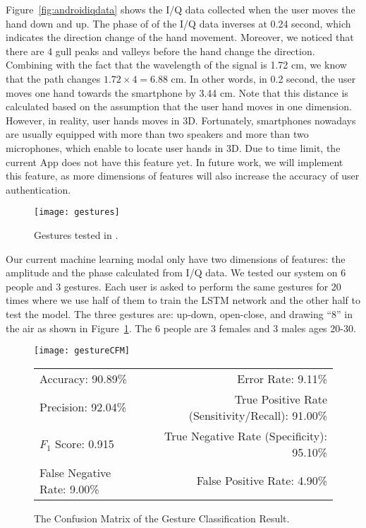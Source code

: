 Figure~\ref{fig:androidiqdata} shows the I/Q data collected when the user moves the hand down and up. The phase of of the I/Q data inverses at 0.24 second, which indicates the direction change of the hand movement. Moreover, we noticed that there are 4 gull peaks and valleys before the hand change the direction. Combining with the fact that the wavelength of the signal is 1.72 cm, we know that the path changes $1.72 \times 4 = 6.88$ cm. In other words, in 0.2 second, the user moves one hand towards the smartphone by 3.44 cm. Note that this distance is calculated based on the assumption that the user hand moves in one dimension. However, in reality, user hands moves in 3D. Fortunately, smartphones nowadays are usually equipped with more than two speakers and more than two microphones, which enable {\uu} to locate user hands in 3D. Due to time limit, the current {\uu}App does not have this feature yet. In future work, we will implement this feature, as more dimensions of features will also increase the accuracy of user authentication.

\begin{figure}[h]
	\centering
	\begin{minipage}{.6\linewidth}
		\texttt{[image: gestures]}
	\end{minipage}
	\caption{Gestures tested in {\uu}.}	
	\label{fig:gestures}
\end{figure}


Our current machine learning modal only have two dimensions of features: the amplitude and the phase calculated from I/Q data. We tested our {\uu} system on 6 people and 3 gestures. Each user is asked to perform the same gestures for 20 times where we use half of them to train the LSTM network and the other half to test the model. The three gestures are: up-down, open-close, and drawing ``8'' in the air as shown in Figure~\ref{fig:gestures}. The 6 people are 3 females and 3 males ages 20-30. 


\begin{figure}[!h]
	\centering
	\begin{minipage}{.35\linewidth}
		\texttt{[image: gestureCFM]}
		\vspace{.05in}
	\end{minipage}
	
	\centering
	\begin{tabular}{lr}
		\toprule
		Accuracy: 90.89\% & \hspace{-.55in} Error Rate: 9.11\% \\
		Precision: 92.04\% & \hspace{-.55in} True Positive Rate (Sensitivity/Recall): 91.00\% \\
		$F_1$ Score: 0.915 & \hspace{-.55in} True Negative Rate (Specificity): 95.10\% \\
		False Negative Rate: 9.00\%  & \hspace{-.55in} False Positive Rate: 4.90\% \\
		\bottomrule
	\end{tabular}
	\caption{The Confusion Matrix of the Gesture Classification Result.
	}
	\label{fig:gestureCFM}
\end{figure}

